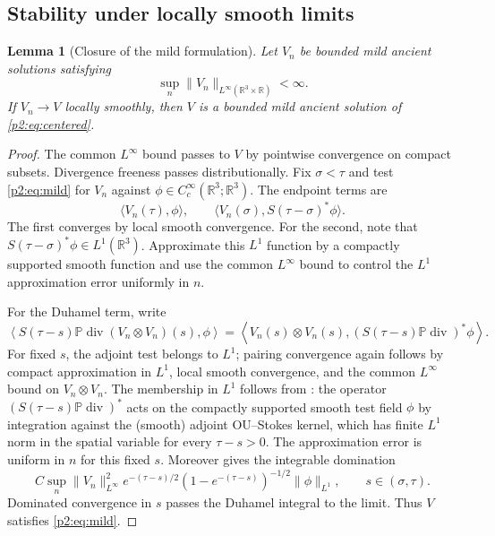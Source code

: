 \documentclass[11pt]{amsart}
\theoremstyle{plain}
\newtheorem{lemma}[lemma]{Lemma}
\theoremstyle{definition}
\theoremstyle{remark}
\numberwithin{equation}{section}
\newcommand{\R}{\mathbb R}
\newcommand{\divergence}{\operatorname{div}}
\begin{document}
\subsection{Stability under locally smooth limits}

\begin{lemma}[Closure of the mild formulation]\label{p2:lem:mild-limit}
Let \(V_n\) be bounded mild ancient solutions satisfying
\[
   \sup_n\|V_n\|_{L^\infty(\R^3\times\R)}<\infty .
\]
If \(V_n\to V\) locally smoothly, then \(V\) is a bounded mild ancient solution
of \eqref{p2:eq:centered}.
\end{lemma}

\begin{proof}
The common \(L^\infty\) bound passes to \(V\) by pointwise convergence on
compact subsets.  Divergence freeness passes distributionally.  Fix
\(\sigma<\tau\) and test \eqref{p2:eq:mild} for \(V_n\) against
\(\phi\in C_c^\infty(\R^3;\R^3)\).  The endpoint terms are
\[
   \langle V_n(\tau),\phi\rangle,
   \qquad
   \langle V_n(\sigma),S(\tau-\sigma)^*\phi\rangle .
\]
The first converges by local smooth convergence.  For the second, note that
\(S(\tau-\sigma)^*\phi\in L^1(\R^3)\).  Approximate this \(L^1\) function by
a compactly supported smooth function and use the common \(L^\infty\) bound to
control the \(L^1\) approximation error uniformly in \(n\).

For the Duhamel term, write
\[
   \left\langle
      S(\tau-s)\mathbb P\divergence(V_n\otimes V_n)(s),\phi
   \right\rangle
   =
   \left\langle
      V_n(s)\otimes V_n(s),
      (S(\tau-s)\mathbb P\divergence)^*\phi
   \right\rangle .
\]
For fixed \(s\), the adjoint test belongs to \(L^1\); pairing convergence
again follows by compact approximation in \(L^1\), local smooth convergence,
and the common \(L^\infty\) bound on \(V_n\otimes V_n\).  The membership in
\(L^1\) follows from : the operator
\((S(\tau-s)\mathbb P\divergence)^*\) acts on the compactly supported smooth
test field \(\phi\) by integration against the (smooth) adjoint OU--Stokes
kernel, which has finite \(L^1\) norm in the spatial variable for every
\(\tau-s>0\).  The approximation
error is uniform in \(n\) for this fixed \(s\).  Moreover
 gives the integrable domination
\[
   C\sup_n\|V_n\|_{L^\infty}^2
   e^{-(\tau-s)/2}(1-e^{-(\tau-s)})^{-1/2}\|\phi\|_{L^1},
   \qquad s\in(\sigma,\tau).
\]
Dominated convergence in \(s\) passes the Duhamel integral to the limit.
Thus \(V\) satisfies \eqref{p2:eq:mild}.
\end{proof}
\end{document}
